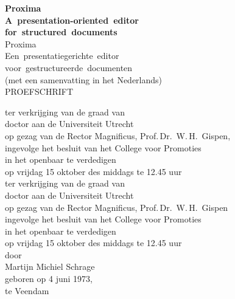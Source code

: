 \newcommand{\engtitle}{Proxima}
\newcommand{\engsubtitle}{A~presentation-oriented~editor\\
for~structured~documents}

\newcommand{\nltitle}{Proxima}
\newcommand{\nlsubtitle}{Een~presentatiegerichte~editor\\
voor~gestructureerde~documenten}

\thispagestyle{empty}

\parbox{141mm}{
\begin{center}
  {\sffamily\bfseries\Huge\engtitle\\
  \vspace{0.1cm}
  \huge\engsubtitle\\}
  \vspace{1cm}
  {\sffamily\huge\nltitle\\
  \vspace{0.1cm}
  \LARGE\nlsubtitle\\}
  \vspace{4mm}
  (met een samenvatting in het Nederlands)\\
  \vspace{1.8cm}
  {\sffamily\Large PROEFSCHRIFT\\}
  
  \vspace{0.7cm}
  ter verkrijging van de graad van\\
  doctor aan de Universiteit Utrecht\\
  op gezag van de Rector Magnificus, Prof.\,Dr.~W.\,H.~Gispen,\\
  ingevolge het besluit van het College voor Promoties\\
  in het openbaar te verdedigen\\
  op vrijdag 15 oktober des middags te 12.45 uur\\
\bc
  ter verkrijging van de graad van\\
  doctor aan de Universiteit Utrecht\\
  op gezag van de Rector Magnificus, Prof.\,Dr.~W.\,H.~Gispen\\
  ingevolge het besluit van het College voor Promoties\\
  in het openbaar te verdedigen\\
  op vrijdag 15 oktober des middags te 12.45 uur\\ \ec
  \vspace{1.1cm} %
  door\\
  \vspace{1.1cm} %
  {\sffamily\Large Martijn Michiel Schrage\\}
  \vspace{1cm}
  geboren op 4 juni 1973,\\
  te Veendam
\end{center}
}

